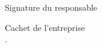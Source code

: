 \documentclass{article}
\begin{document}
\begin{center}
\begin{minipage}[c]{150mm}
\begin{minipage}[c]{40mm}
\begin{center}
 Signature du responsable\\
 \vspace*{3mm}
\dotfill
\end{center}
\end{minipage}
\hfill
\begin{minipage}[c]{40mm}
\begin{center}
 Cachet de l'entreprise\\
 \vspace*{3mm}
.
\end{center}
\end{minipage}
\end{minipage}
\end{center}
\end{document}
